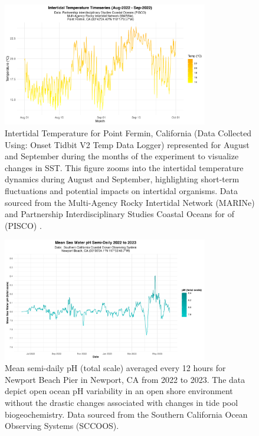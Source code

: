 \documentclass[
]{article}
\begin{document}
\begin{figure}[htbp]
  \centering
  \includegraphics[width=0.8\textwidth]{Images/experiment_temp_timeseries_plot.png}
  \caption{Intertidal Temperature for Point Fermin, California (Data Collected Using: Onset Tidbit V2 Temp Data Logger) represented for August and September during the months of the experiment to visualize changes in SST. This figure zooms into the intertidal temperature dynamics during August and September, highlighting short-term fluctuations and potential impacts on intertidal organisms. Data sourced from the Multi-Agency Rocky Intertidal Network (MARINe) and Partnership Interdisciplinary Studies Coastal Oceans for of (PISCO) \citep{marine_pisco_burnaford_2023}.}
  \label{fig:intertidal-timeseries-zoom}
\end{figure}

\begin{figure}[htbp]
  \centering
  \includegraphics[width=0.8\textwidth]{Images/pH_timeseries_plot.png}
  \caption{Mean semi-daily pH (total scale) averaged every 12 hours for Newport Beach Pier in Newport, CA from 2022 to 2023. The data depict open ocean pH variability in an open shore environment without the drastic changes associated with changes in tide pool biogeochemistry. Data sourced from the Southern California Ocean Observing Systems (SCCOOS).}
  \label{fig:ph-timeseries}
\end{figure}
\end{document}
